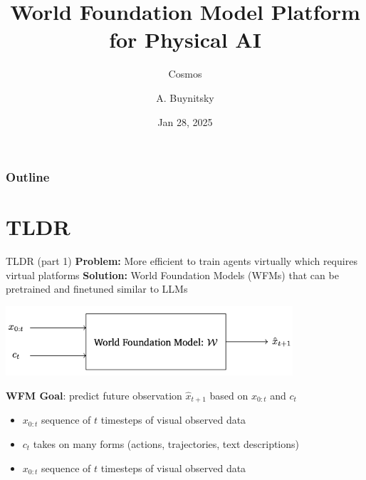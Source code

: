 \documentclass{beamer}
\title[Cosmos ]{World Foundation Model Platform for Physical AI}
\subtitle{Cosmos} %
\author[MLP]{A. Buynitsky}
\date{Jan 28, 2025}
\begin{document}
\frame{\titlepage}


\begin{frame}
\frametitle{Outline}
\tableofcontents
\end{frame}
\section{TLDR}
\begin{frame}[t]{TLDR (part 1)}
    \textbf{Problem:} More efficient to train agents virtually which requires virtual platforms \newline
    \textbf{Solution:} World Foundation Models (WFMs) that can be pretrained and finetuned similar to LLMs\newline
    \begin{center}
        \includegraphics[width=0.8\textwidth]{./img/tldr_2.png}
    \end{center}
    \textbf{WFM Goal}: predict future observation $\hat{x}_{t+1}$ based on $ x_{0:t}$ and $c_t$
    \small
    \begin{itemize}[label=-]
        \item $ x_{0:t}$ sequence of $t$ timesteps of visual observed data
        \item $c_t$ takes on many forms (actions, trajectories, text descriptions)
        \item $ x_{0:t}$ sequence of $t$ timesteps of visual observed data
    \end{itemize}
    \normalsize
            
\end{frame}
\end{document}
